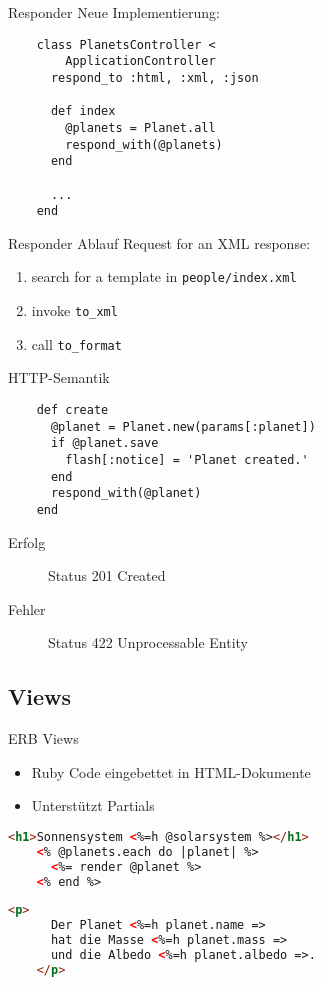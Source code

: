 \begin{frame}[fragile]{Responder}
  Neue Implementierung:
  \begin{lstlisting}
    class PlanetsController <
        ApplicationController
      respond_to :html, :xml, :json

      def index
        @planets = Planet.all
        respond_with(@planets)
      end

      ...
    end
  \end{lstlisting}
\end{frame}

\begin{frame}{Responder Ablauf}
  Request for an XML response:
  \begin{enumerate}
    \item search for a template in \lstinline|people/index.xml|
    \item invoke \lstinline|to_xml|
    \item call \lstinline|to_format|
  \end{enumerate}
\end{frame}

\begin{frame}[fragile]{HTTP-Semantik}
  \begin{lstlisting}
    def create
      @planet = Planet.new(params[:planet])
      if @planet.save
        flash[:notice] = 'Planet created.'
      end
      respond_with(@planet)
    end
  \end{lstlisting}

  \begin{description}
    \item[Erfolg] Status 201 Created
    \item[Fehler] Status 422 Unprocessable Entity
  \end{description}
\end{frame}

\subsection{Views}

\begin{frame}[fragile]{ERB Views}
  \begin{itemize}
    \item Ruby Code eingebettet in HTML-Dokumente
    \item Unterstützt Partials
  \end{itemize}

  \begin{lstlisting}[language=HTML]
    <h1>Sonnensystem <%=h @solarsystem %></h1>
    <% @planets.each do |planet| %>
      <%= render @planet %>
    <% end %>
  \end{lstlisting}

  \begin{lstlisting}[language=HTML]
    <p>
      Der Planet <%=h planet.name =>
      hat die Masse <%=h planet.mass =>
      und die Albedo <%=h planet.albedo =>.
    </p>
  \end{lstlisting}
\end{frame}

